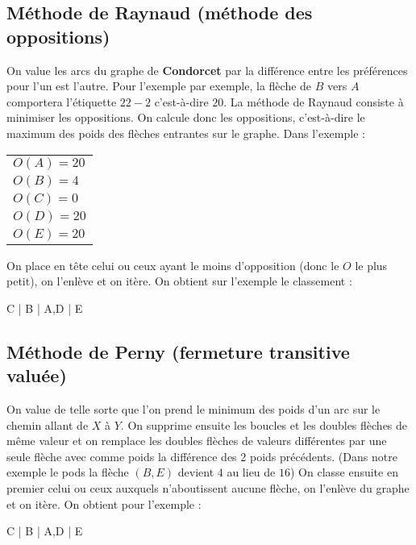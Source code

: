 \documentclass{article}
\begin{document}
\subsection{Méthode de Raynaud (méthode des oppositions)}

On value les arcs du graphe de \textbf{Condorcet} par la différence entre les préférences pour l'un est l'autre. Pour l'exemple par exemple, la flèche de $B$ vers $A$ 
comportera l'étiquette $22-2$ c'est-à-dire $20$. La méthode de Raynaud consiste à minimiser les oppositions. On calcule donc les oppositions, c'est-à-dire le maximum des poids 
des flèches entrantes sur le graphe. Dans l'exemple : 

\begin{center}
	\begin{tabular}{l}
	$O(A) = 20$ \\
	$O(B) = 4$ \\
	$O(C) = 0$ \\
	$O(D) = 20$ \\
	$O(E) = 20$ \\
	\end{tabular}
\end{center}

On place en tête celui ou ceux ayant le moins d'opposition (donc le $O$ le plus petit), on l'enlève et on itère. On obtient sur l'exemple le classement : 

\begin{center}
	\begin{boxedverbatim}
 C
 |
 B
 |
A,D
 |
 E
	\end{boxedverbatim}
\end{center}

\subsection{Méthode de Perny (fermeture transitive valuée)}

On value de telle sorte que l'on prend le minimum des poids d'un arc sur le chemin allant de $X$ à $Y$. On supprime ensuite les boucles et les doubles flèches de même valeur et on 
remplace les doubles flèches de valeurs différentes par une seule flèche avec comme poids la différence des 2 poids précédents. (Dans notre exemple le pods la flèche $(B,E)$ 
devient $4$ au lieu de $16$) On classe ensuite en premier celui ou ceux auxquels n'aboutissent aucune flèche, on l'enlève du graphe et on itère. On obtient pour l'exemple : 

\begin{center}
	\begin{boxedverbatim}
 C
 |
 B
 |
A,D
 |
 E
	\end{boxedverbatim}
\end{center}
\end{document}
